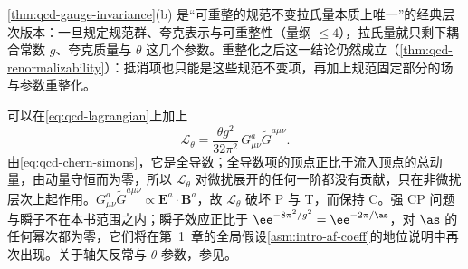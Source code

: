 \cref{thm:qcd-gauge-invariance}(b) 是“可重整的规范不变拉氏量本质上唯一”的经典层次版本：一旦规定规范群、夸克表示与可重整性（量纲 $\le4$），拉氏量就只剩下耦合常数 $g$、夸克质量与 $\theta$ 这几个参数。重整化之后这一结论仍然成立（\cref{thm:qcd-renormalizability}）：抵消项也只能是这些规范不变项，再加上规范固定部分的场与参数重整化。

\begin{remark}[$\theta$ 项]\label{rem:qcd-theta}
可以在\cref{eq:qcd-lagrangian}上加上
\[
\mathcal L_\theta=\frac{\theta g^2}{32\pi^2}\,G^a_{\mu\nu}\tilde G^{a\mu\nu}.
\]
由\cref{eq:qcd-chern-simons}，它是全导数；全导数项的顶点正比于流入顶点的总动量，由动量守恒而为零，所以 $\mathcal L_\theta$ 对微扰展开的任何一阶都没有贡献，只在非微扰层次上起作用。$G^a_{\mu\nu}\tilde G^{a\mu\nu}\propto\boldsymbol E^a\cdot\boldsymbol B^a$，故 $\mathcal L_\theta$ 破坏 P 与 T，而保持 C。强 CP 问题与瞬子不在本书范围之内；瞬子效应正比于 $\ee^{-8\pi^2/g^2}=\ee^{-2\pi/\as}$，对 $\as$ 的任何幂次都为零，它们将在第~1~章的全局假设\cref{asm:intro-af-coeff}的地位说明中再次出现。关于轴矢反常与 $\theta$ 参数，参见\cite[第~19~章]{PeskinSchroeder1995}。
\end{remark}

